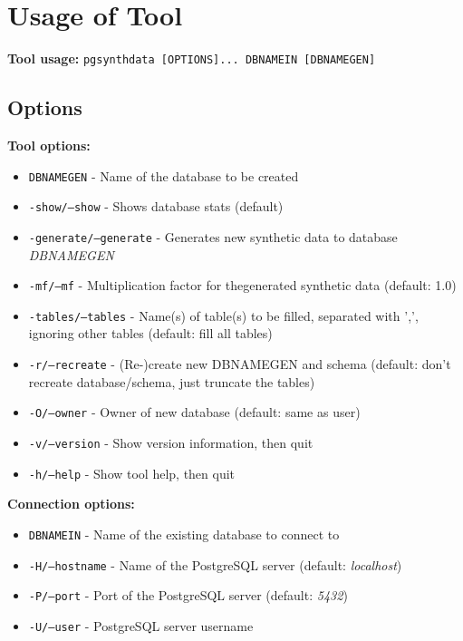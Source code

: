 \chapter{Usage of Tool}
\textbf{Tool usage:} \newline
\texttt{pgsynthdata [OPTIONS]... DBNAMEIN [DBNAMEGEN]} \\
\newline
\section{Options}
\textbf{Tool options:}
\begin{itemize}
	\item \texttt{DBNAMEGEN} - Name of the database to be created
	\item \texttt{-show/--show} - Shows database stats (default)
	\item \texttt{-generate/--generate} - Generates new synthetic data to database \textit{DBNAMEGEN}
	\item \texttt{-mf/--mf} - Multiplication factor for thegenerated synthetic data (default: 1.0)
	\item \texttt{-tables/--tables} - Name(s) of table(s) to be filled, separated with ',', ignoring other tables (default: fill all tables)
	\item \texttt{-r/--recreate} - (Re-)create new DBNAMEGEN and schema (default: don't recreate database/schema, just truncate the tables)
	\item \texttt{-O/--owner} - Owner of new database (default: same as user)
	\item \texttt{-v/--version} - Show version information, then quit
	\item \texttt{-h/--help} - Show tool help, then quit
	\newline
\end{itemize}
\textbf{Connection options:}
\begin{itemize}
	\item \texttt{DBNAMEIN} - Name of the existing database to connect to
	\item \texttt{-H/--hostname} - Name of the PostgreSQL server (default: \textit{localhost})
	\item \texttt{-P/--port} - Port of the PostgreSQL server (default: \textit{5432})
	\item \texttt{-U/--user} - PostgreSQL server username
	\newline
\end{itemize}
